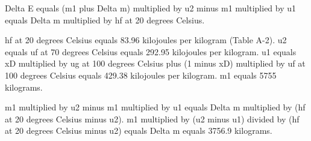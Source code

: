 Delta E equals (m1 plus Delta m) multiplied by u2 minus m1 multiplied by u1 equals Delta m multiplied by hf at 20 degrees Celsius.  

hf at 20 degrees Celsius equals 83.96 kilojoules per kilogram (Table A-2).  
u2 equals uf at 70 degrees Celsius equals 292.95 kilojoules per kilogram.  
u1 equals xD multiplied by ug at 100 degrees Celsius plus (1 minus xD) multiplied by uf at 100 degrees Celsius equals 429.38 kilojoules per kilogram.  
m1 equals 5755 kilograms.  

m1 multiplied by u2 minus m1 multiplied by u1 equals Delta m multiplied by (hf at 20 degrees Celsius minus u2).  
m1 multiplied by (u2 minus u1) divided by (hf at 20 degrees Celsius minus u2) equals Delta m equals 3756.9 kilograms.